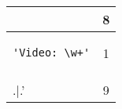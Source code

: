 \begin{table}
\begin{center}
\begin{tabular}{lc}
\begin{minipage}{2.4in}
\end{minipage}
& 8 \\ 
\midrule
\begin{minipage}{2.4in}
\begin{verbatim}
'Video: \w+'\end{verbatim}
\end{minipage}
& 1 \\ 
\midrule
\begin{minipage}{2.4in}
\begin{verbatim}
'\\.|.'\end{verbatim}
\end{minipage}
& 9 \\ 
\bottomrule
\end{tabular}
\end{center}
\end{table}
